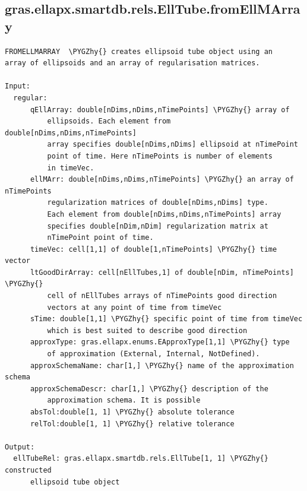 \documentclass[letterpaper,10pt,english]{sphinxmanual}
\def\PYGZhy{\char`\-}
\begin{document}
\subsection{gras.ellapx.smartdb.rels.EllTube.fromEllMArray}
\label{chap_functions:gras-ellapx-smartdb-rels-elltube-fromellmarray}
\begin{Verbatim}[commandchars=\\\{\}]
FROMELLMARRAY  \PYGZhy{} creates ellipsoid tube object using an
array of ellipsoids and an array of regularisation matrices.

Input:
  regular:
      qEllArray: double[nDims,nDims,nTimePoints] \PYGZhy{} array of
          ellipsoids. Each element from double[nDims,nDims,nTimePoints]
          array specifies double[nDims,nDims] ellipsoid at nTimePoint
          point of time. Here nTimePoints is number of elements
          in timeVec.
      ellMArr: double[nDims,nDims,nTimePoints] \PYGZhy{} an array of nTimePoints
          regularization matrices of double[nDims,nDims] type.
          Each element from double[nDims,nDims,nTimePoints] array
          specifies double[nDim,nDim] regularization matrix at
          nTimePoint point of time.
      timeVec: cell[1,1] of double[1,nTimePoints] \PYGZhy{} time vector
      ltGoodDirArray: cell[nEllTubes,1] of double[nDim, nTimePoints] \PYGZhy{}
          cell of nEllTubes arrays of nTimePoints good direction
          vectors at any point of time from timeVec
      sTime: double[1,1] \PYGZhy{} specific point of time from timeVec
          which is best suited to describe good direction
      approxType: gras.ellapx.enums.EApproxType[1,1] \PYGZhy{} type
          of approximation (External, Internal, NotDefined).
      approxSchemaName: char[1,] \PYGZhy{} name of the approximation schema
      approxSchemaDescr: char[1,] \PYGZhy{} description of the
          approximation schema. It is possible
      absTol:double[1, 1] \PYGZhy{} absolute tolerance
      relTol:double[1, 1] \PYGZhy{} relative tolerance

Output:
  ellTubeRel: gras.ellapx.smartdb.rels.EllTube[1, 1] \PYGZhy{} constructed
      ellipsoid tube object
\end{Verbatim}
\end{document}
